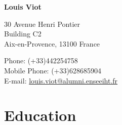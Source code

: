 \documentclass{article}
\def\name{Louis Viot}
\begin{document}
{\huge \bf \name}\\
\bigskip
\begin{minipage}[t]{0.495\textwidth}
	30 Avenue Henri Pontier \\
    Building C2 \\
    Aix-en-Provence, 13100 France
\end{minipage}
\begin{minipage}[t]{0.495\textwidth}
	Phone: (+33)442254758 \\
	Mobile Phone: (+33)628685904 \\
	E-mail: \href{mailto:louis.viot@alumni.enseeiht.fr}{louis.viot@alumni.enseeiht.fr} \\
\end{minipage}

\section*{Education}
\end{document}
